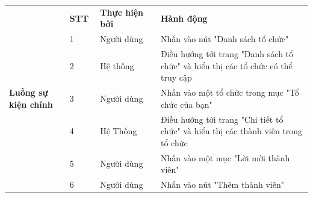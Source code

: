 \documentclass[../DoAn.tex]{subfiles}
\begin{document}
\begin{table}[ht]
\begin{tabular}{| p{0.2\linewidth} | p{0.1\linewidth} | p{0.2\linewidth} | p{0.5\linewidth} |}
        \multirow{12}{\linewidth}{\textbf{Luồng sự kiện chính}}      & \multicolumn{1}{p{0.1\linewidth}|}{\textbf{STT}}                                             & \multicolumn{1}{p{0.2\linewidth}|}{\textbf{Thực hiện bởi}} & \multicolumn{1}{p{0.5\linewidth}|}{\textbf{Hành động}}                                                                                \\ \cline{2-4}
                                                                     & \multicolumn{1}{p{0.1\linewidth}|}{1}                                                        & \multicolumn{1}{p{0.2\linewidth}|}{Người dùng}             & \multicolumn{1}{p{0.5\linewidth}|}{Nhấn vào nút "Danh sách tổ chức"}                                                                  \\ \cline{2-4}
                                                                     & \multicolumn{1}{p{0.1\linewidth}|}{2}                                                        & \multicolumn{1}{p{0.2\linewidth}|}{Hệ thống}               & \multicolumn{1}{p{0.5\linewidth}|}{Điều hướng tới trang "Danh sách tổ chức" và hiển thị các tổ chức có thể truy cập}                  \\ \cline{2-4}
                                                                     & \multicolumn{1}{p{0.1\linewidth}|}{3}                                                        & \multicolumn{1}{p{0.2\linewidth}|}{Người dùng}             & \multicolumn{1}{p{0.5\linewidth}|}{Nhấn vào một tổ chức trong mục "Tổ chức của bạn"}                                                  \\ \cline{2-4}
                                                                     & \multicolumn{1}{p{0.1\linewidth}|}{4}                                                        & \multicolumn{1}{p{0.2\linewidth}|}{Hệ Thống}               & \multicolumn{1}{p{0.5\linewidth}|}{Điều hướng tới trang "Chi tiết tổ chức" và hiển thị các thành viên trong tổ chức}                  \\ \cline{2-4}
                                                                     & \multicolumn{1}{p{0.1\linewidth}|}{5}                                                        & \multicolumn{1}{p{0.2\linewidth}|}{Người dùng}             & \multicolumn{1}{p{0.5\linewidth}|}{Nhấn vào một mục "Lời mời thành viên"}                                                             \\ \cline{2-4}
                                                                     & \multicolumn{1}{p{0.1\linewidth}|}{6}                                                        & \multicolumn{1}{p{0.2\linewidth}|}{Người dùng}             & \multicolumn{1}{p{0.5\linewidth}|}{Nhấn vào nút "Thêm thành viên"}                                                                    \\ \cline{2-4}

\end{tabular}
\end{table}
\end{document}

